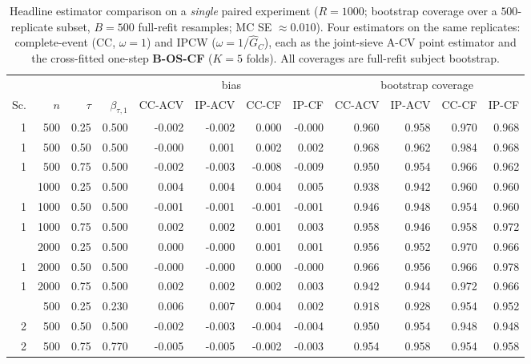 \begin{table}[t]\centering\small
\caption{Headline estimator comparison on a \emph{single} paired experiment ($R=1000$; bootstrap coverage over a $500$-replicate subset, $B=500$ full-refit resamples; MC SE $\approx0.010$). Four estimators on the same replicates: complete-event (CC, $\omega=1$) and IPCW ($\omega=1/\widehat G_C$), each as the joint-sieve A-CV point estimator and the cross-fitted one-step \textbf{B-OS-CF} ($K=5$ folds). All coverages are full-refit subject bootstrap.}
\label{tab:estsim}\begin{tabular}{rrr r rrrr rrrr}\toprule
&&&& \multicolumn{4}{c}{bias} & \multicolumn{4}{c}{bootstrap coverage}\\
\cmidrule(lr){5-8}\cmidrule(lr){9-12}
Sc.&$n$&$\tau$&$\beta_{\tau,1}$& \tiny CC-ACV & \tiny IP-ACV & \tiny CC-CF & \tiny IP-CF & \tiny CC-ACV & \tiny IP-ACV & \tiny CC-CF & \tiny IP-CF\\\midrule
1 & 500 & 0.25 & 0.500 & -0.002 & -0.002 & 0.000 & -0.000 & 0.960 & 0.958 & 0.970 & 0.968 \\
1 & 500 & 0.50 & 0.500 & -0.000 & 0.001 & 0.002 & 0.002 & 0.968 & 0.962 & 0.984 & 0.968 \\
1 & 500 & 0.75 & 0.500 & -0.002 & -0.003 & -0.008 & -0.009 & 0.950 & 0.954 & 0.966 & 0.962 \\
\addlinespace
1 & 1000 & 0.25 & 0.500 & 0.004 & 0.004 & 0.004 & 0.005 & 0.938 & 0.942 & 0.960 & 0.960 \\
1 & 1000 & 0.50 & 0.500 & -0.001 & -0.001 & -0.001 & -0.001 & 0.946 & 0.948 & 0.954 & 0.960 \\
1 & 1000 & 0.75 & 0.500 & 0.002 & 0.002 & 0.001 & 0.003 & 0.958 & 0.946 & 0.958 & 0.972 \\
\addlinespace
1 & 2000 & 0.25 & 0.500 & 0.000 & -0.000 & 0.001 & 0.001 & 0.956 & 0.952 & 0.970 & 0.966 \\
1 & 2000 & 0.50 & 0.500 & -0.000 & -0.000 & 0.000 & -0.000 & 0.966 & 0.956 & 0.966 & 0.978 \\
1 & 2000 & 0.75 & 0.500 & 0.002 & 0.002 & 0.002 & 0.003 & 0.942 & 0.944 & 0.972 & 0.966 \\
\addlinespace
2 & 500 & 0.25 & 0.230 & 0.006 & 0.007 & 0.004 & 0.002 & 0.918 & 0.928 & 0.954 & 0.952 \\
2 & 500 & 0.50 & 0.500 & -0.002 & -0.003 & -0.004 & -0.004 & 0.950 & 0.954 & 0.948 & 0.948 \\
2 & 500 & 0.75 & 0.770 & -0.005 & -0.005 & -0.002 & -0.003 & 0.954 & 0.958 & 0.954 & 0.958 \\

\end{tabular}
\end{table}
